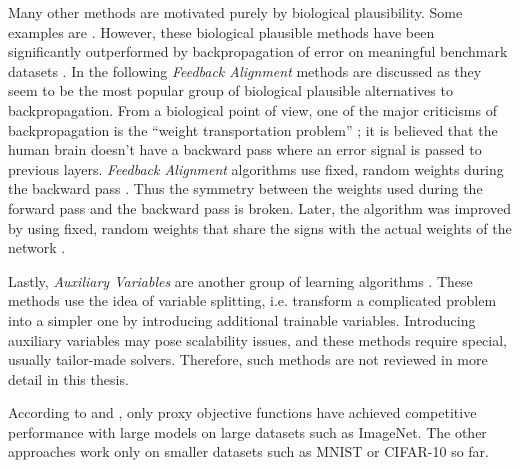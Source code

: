 Many other methods are motivated purely by biological plausibility.
Some examples are \cite{10.5555.3157096.3157213, Lillicrap_Cownden_Tweed_Akerman_2016, Xiao_Chen_Liao_Poggio_2019, aaai.BalduzziVB15, 10.5555/3016100.3016156}.
However, these biological plausible methods have been significantly outperformed by backpropagation of error on meaningful benchmark datasets .
In the following \emph{Feedback Alignment} methods are discussed as they seem to be the most popular group of biological plausible alternatives to backpropagation.
From a biological point of view, one of the major criticisms of backpropagation is the ``weight transportation problem'' ; it is believed that the human brain doesn't have a backward pass where an error signal is passed to previous layers.
\emph{Feedback Alignment} algorithms use fixed, random weights during the backward pass \cite{Lillicrap_Cownden_Tweed_Akerman_2016}.
Thus the symmetry between the weights used during the forward pass and the backward pass is broken.
Later, the algorithm was improved by using fixed, random weights that share the signs with the actual weights of the network .

Lastly, \emph{Auxiliary Variables} are another group of learning algorithms \cite{pmlr-v33-carreira-perpinan14, 10.5555/3045390.3045677, 10.5555/3294771.3294935, Lau_Zeng_Wu_Yao_2018}.
These methods use the idea of variable splitting, i.e. transform a complicated problem into a simpler one by introducing additional trainable variables.
Introducing auxiliary variables may pose scalability issues, and these methods require special, usually tailor-made solvers.
Therefore, such methods are not reviewed in more detail in this thesis.

According to  and , only proxy objective functions have achieved competitive performance with large models on large datasets such as ImageNet.
The other approaches work only on smaller datasets such as MNIST or CIFAR-10 so far.



